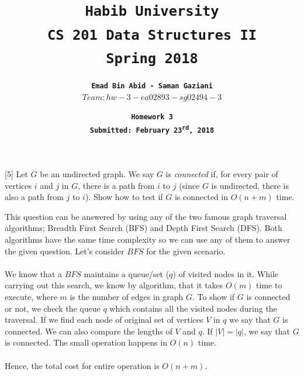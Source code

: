 \documentclass[addpoints]{exam}
\title{\textbf{\tt Habib University}\\ \textbf{\tt CS 201 Data Structures II}\\ \textbf{\tt Spring 2018}}
\author{\textbf{\tt Emad Bin Abid - Saman Gaziani}\\ {\tt $Team: hw-3-ea02893-sg02494-3$}}
\date{\textbf{\tt Homework 3}\\ \textbf{\tt Submitted: February 23\textsuperscript{rd}, 2018}}
\begin{document}
\maketitle

\begin{questions}

  [5]
  Let $G$ be an undirected graph. We say $G$ is {\it connected} if, for every pair of vertices $i$ and $j$ in $G$, there is a path from $i$ to $j$ (since $G$ is undirected, there is also a path from $j$ to $i$). Show how to test if $G$ is connected in $O(n + m)$ time.
  \begin{solution}
  	This question can be answered by using any of the two famous graph traversal algorithms; Breadth First Search (BFS) and Depth First Search (DFS). Both algorithms have the same time complexity so we can use any of them to answer the given question. Let's consider $BFS$ for the given scenario. \\ \\
  	We know that a $BFS$ maintains a queue/set ($q$) of visited nodes in it. While carrying out this search, we know by algorithm, that it takes $O(m)$ time to execute, where $m$ is the number of edges in  graph $G$. To show if $G$ is connected or not, we check the queue $q$ which contains all the visited nodes during the traversal. If we find each node of original set of vertices $V$ in $q$ we say that $G$ is connected. We can also compare the lengths of $V$ and $q$. If $\left|V\right| = \left|q\right|$, we say that $G$ is connected. The small operation happens in $O(n)$ time. \\ \\
  	Hence, the total cost for entire operation is $O(n+m)$.

\end{solution}
\end{questions}
\end{document}
